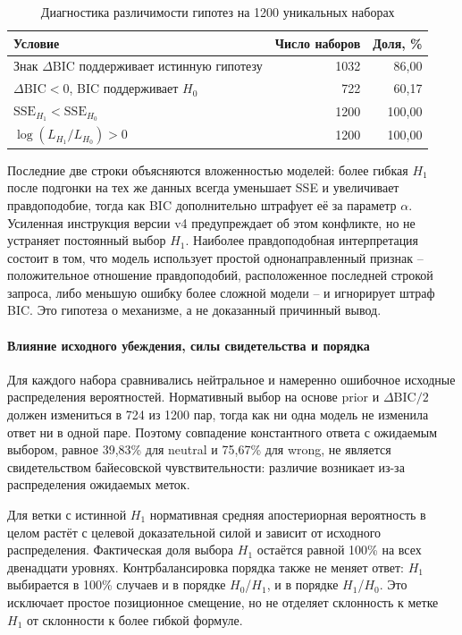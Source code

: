 \documentclass[a4paper,14pt]{extarticle}
\newcommand{\Hnull}{\ensuremath{H_0}}
\newcommand{\Hone}{\ensuremath{H_1}}
\newcommand{\DeltaBIC}{\ensuremath{\Delta\mathrm{BIC}}}
\begin{document}
\begin{table}[ht]
  \centering
  \small
  \caption{Диагностика различимости гипотез на 1200 уникальных наборах}
  \label{tab:diagnostics}
  \begin{tabularx}{\textwidth}{X r r}
    \toprule
    \textbf{Условие} & \textbf{Число наборов} & \textbf{Доля, \%} \\
    \midrule
    Знак \DeltaBIC{} поддерживает истинную гипотезу & 1032 & 86,00 \\
    $\Delta\mathrm{BIC}<0$, BIC поддерживает \Hnull{} & 722 & 60,17 \\
    $\mathrm{SSE}_{H_1}<\mathrm{SSE}_{H_0}$ & 1200 & 100,00 \\
    $\log (L_{H_1}/L_{H_0})>0$ & 1200 & 100,00 \\
    \bottomrule
  \end{tabularx}
\end{table}

Последние две строки объясняются вложенностью моделей: более гибкая \Hone{} после подгонки на тех же данных всегда уменьшает SSE и увеличивает правдоподобие, тогда как BIC дополнительно штрафует её за параметр $\alpha$. Усиленная инструкция версии v4 предупреждает об этом конфликте, но не устраняет постоянный выбор \Hone. Наиболее правдоподобная интерпретация состоит в том, что модель использует простой однонаправленный признак -- положительное отношение правдоподобий, расположенное последней строкой запроса, либо меньшую ошибку более сложной модели -- и игнорирует штраф BIC. Это гипотеза о механизме, а не доказанный причинный вывод.

\paragraph{Влияние исходного убеждения, силы свидетельства и порядка}

Для каждого набора сравнивались нейтральное и намеренно ошибочное исходные распределения вероятностей. Нормативный выбор на основе prior и $\Delta\mathrm{BIC}/2$ должен измениться в 724 из 1200 пар, тогда как ни одна модель не изменила ответ ни в одной паре. Поэтому совпадение константного ответа с ожидаемым выбором, равное 39,83\% для neutral и 75,67\% для wrong, не является свидетельством байесовской чувствительности: различие возникает из-за распределения ожидаемых меток.

Для ветки с истинной \Hone{} нормативная средняя апостериорная вероятность в целом растёт с целевой доказательной силой и зависит от исходного распределения. Фактическая доля выбора \Hone{} остаётся равной 100\% на всех двенадцати уровнях. Контрбалансировка порядка также не меняет ответ: \Hone{} выбирается в 100\% случаев и в порядке \Hnull/\Hone, и в порядке \Hone/\Hnull. Это исключает простое позиционное смещение, но не отделяет склонность к метке \Hone{} от склонности к более гибкой формуле.
\end{document}

